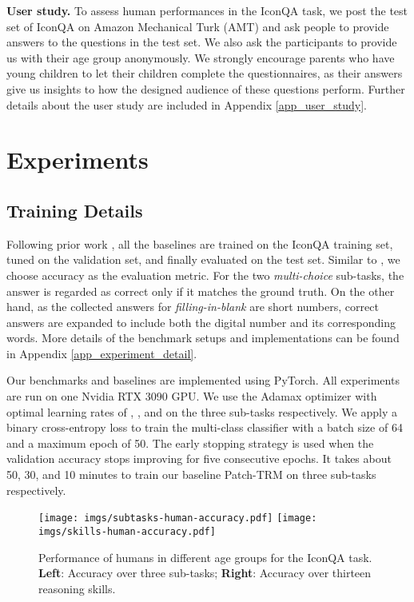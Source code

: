 \documentclass{article}
\begin{document}
\textbf{User study.} To assess human performances in the IconQA task, we post the test set of IconQA on Amazon Mechanical Turk (AMT) and ask people to provide answers to the questions in the test set. We also ask the participants to provide us with their age group anonymously. We strongly encourage parents who have young children to let their children complete the questionnaires, as their answers give us insights to how the designed audience of these questions perform. Further details about the user study are included in Appendix \ref{app_user_study}.






\section{Experiments}







\subsection{Training Details}
\label{sec:implementation}

Following prior work \cite{antol2015vqa}, all the baselines are trained on the IconQA training set, tuned on the validation set, and finally evaluated on the test set. Similar to \cite{antol2015vqa}, we choose accuracy as the evaluation metric. For the two \textit{multi-choice} sub-tasks, the answer is regarded as correct only if it matches the ground truth. On the other hand, as the collected answers for \textit{filling-in-blank} are short numbers, correct answers are expanded to include both the digital number and its corresponding words. More details of the benchmark setups and implementations can be found in Appendix \ref{app_experiment_detail}.

Our benchmarks and baselines are implemented using PyTorch. All experiments are run on one Nvidia RTX 3090 GPU. We use the Adamax optimizer with optimal learning rates of , , and  on the three sub-tasks respectively. We apply a binary cross-entropy loss to train the multi-class classifier with a batch size of 64 and a maximum epoch of 50. The early stopping strategy is used when the validation accuracy stops improving for five consecutive epochs. It takes about 50, 30, and 10 minutes to train our baseline Patch-TRM on three sub-tasks respectively.

\begin{figure*}[t]
    \centering 
\texttt{[image: imgs/subtasks-human-accuracy.pdf]}
    \texttt{[image: imgs/skills-human-accuracy.pdf]}
    \vspace{-1mm}
    \caption{Performance of humans in different age groups for the IconQA task. \textbf{Left}: Accuracy over three sub-tasks; \textbf{Right}: Accuracy over thirteen reasoning skills.}
\label{fig:humanperf}
\end{figure*}
\end{document}
